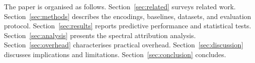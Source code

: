 The paper is organised as follows.
Section~\ref{sec:related} surveys related work.
Section~\ref{sec:methods} describes the encodings, baselines, datasets,
and evaluation protocol.
Section~\ref{sec:results} reports predictive performance and statistical tests.
Section~\ref{sec:analysis} presents the spectral attribution analysis.
Section~\ref{sec:overhead} characterises practical overhead.
Section~\ref{sec:discussion} discusses implications and limitations.
Section~\ref{sec:conclusion} concludes.
